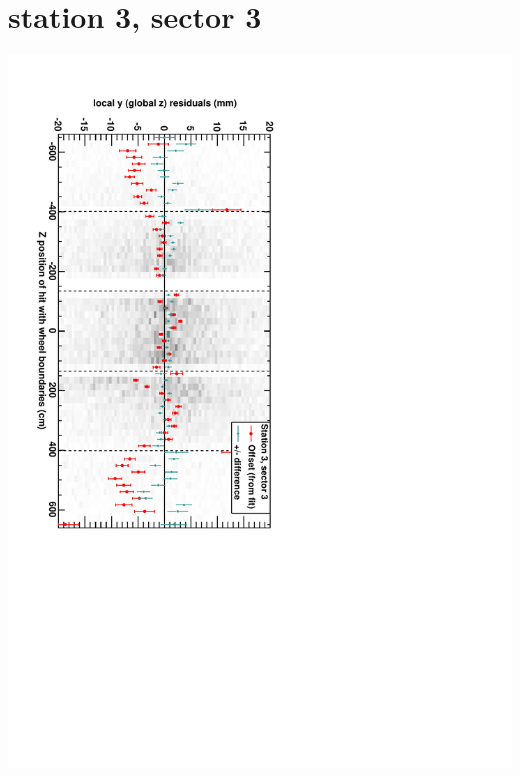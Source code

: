 \documentclass[compress]{beamer}
\begin{document}
\section*{station 3, sector 3}
\begin{frame} \vfill \mbox{\hspace{-1 cm}\includegraphics[height=1.2\linewidth, angle=90]{DTzVsZ_st3_sr03.pdf}} \end{frame}
\end{document}
